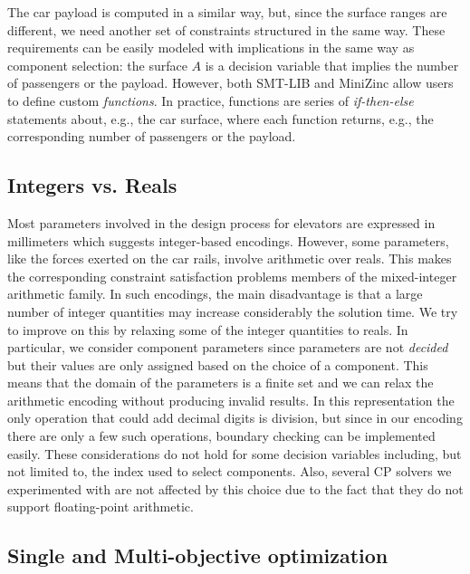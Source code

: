 The car payload is computed in a similar way, but,
since the surface ranges are different, we need another set of 
constraints structured in the same way.
These requirements can be easily modeled with implications in the same
way as component selection: the surface $A$ is a decision variable
that implies the number of passengers or the payload. However,
both SMT-LIB and MiniZinc allow users to define custom 
\textit{functions}. In practice, functions are series of 
\textit{if-then-else} statements about, e.g., the car surface, where 
each function returns, e.g., the corresponding number of passengers 
or the payload.

\subsection{Integers vs. Reals}
Most parameters involved in the design process for elevators are 
expressed in millimeters which suggests integer-based encodings.
However, some parameters, like the forces exerted on the car rails,
involve arithmetic over reals. This makes the corresponding
constraint satisfaction problems members of the mixed-integer
arithmetic family. In such encodings, the main disadvantage is that a 
large number of integer quantities may increase considerably the
solution time. We try to improve on this by relaxing some of the
integer quantities to reals.
In particular, we consider component parameters since 
parameters are not \textit{decided} but their values are only assigned
based on the choice of a component. This means that the domain of the
parameters is a finite set and we can relax the arithmetic encoding 
without producing invalid results. In this representation the only 
operation that could add decimal digits is division, but since in our
encoding there are only a few such operations, boundary checking can 
be implemented easily. These considerations do not hold for some 
decision variables including, but not limited to, the index used to 
select components. Also, several CP solvers we experimented with are 
not affected by this choice due to the fact that they do not support
floating-point arithmetic.

\subsection{Single and Multi-objective optimization}

